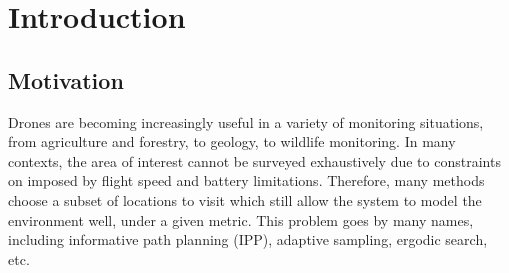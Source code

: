 
\chapter{Introduction} \label{secIntro}
\section{Motivation}
Drones are becoming increasingly useful in a variety of monitoring situations, from agriculture and forestry, to geology, to wildlife monitoring. In many contexts, the area of interest cannot be surveyed exhaustively due to constraints on imposed by flight speed and battery limitations. Therefore, many methods choose a subset of locations to visit which still allow the system to model the environment well, under a given metric. This problem goes by many names, including informative path planning (IPP), adaptive sampling, ergodic search, etc.

\section{}
%
%
%
%
%
%
%
